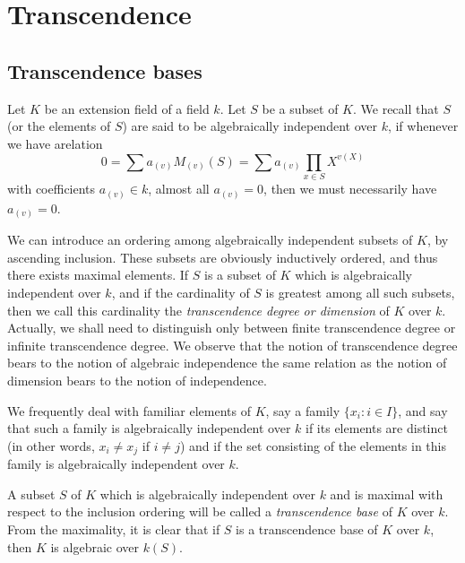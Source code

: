 \section{Transcendence}
\subsection{Transcendence bases}
Let \(K\) be an extension field of a field \(k\). Let \(S\) be a subset of
\(K\). We recall that \(S\) (or the elements of \(S\)) are said to be
algebraically independent over \(k\), if whenever we have arelation
\[
  0=\sum a_{(v)}M_{(v)}(S)=\sum a_{(v)}\prod_{x\in S}X^{v(X)}
\]
with coefficients \(a_{(v)}\in k\), almost all \(a_{(v)}=0\), then we must
necessarily have \(a_{(v)}=0\).

We can introduce an ordering among algebraically independent subsets of
\(K\), by ascending inclusion. These subsets are obviously inductively
ordered, and thus there exists maximal elements. If \(S\) is a subset of
\(K\) which is algebraically independent over \(k\), and if the cardinality
of \(S\) is greatest among all such subsets, then we call this cardinality
the \emph{transcendence degree or dimension} of \(K\) over \(k\). Actually,
we shall need to distinguish only between finite transcendence degree or
infinite transcendence degree. We observe that the notion of transcendence
degree bears to the notion of algebraic independence the same relation as
the notion of dimension bears to the notion of independence.

We frequently deal with familiar elements of \(K\), say a family
\(\{x_i:i\in I\}\), and say that such a family is algebraically independent
over \(k\) if its elements are distinct (in other words, \(x_i\neq x_j\) if
\(i\neq j\)) and if the set consisting of the elements in this family is
algebraically independent over \(k\).

A subset \(S\) of \(K\) which is algebraically independent over \(k\) and
is maximal with respect to the inclusion ordering will be called a
\emph{transcendence base} of \(K\) over \(k\). From the maximality, it is
clear that if \(S\) is a transcendence base of \(K\) over \(k\), then \(K\)
is algebraic over \(k(S)\).

